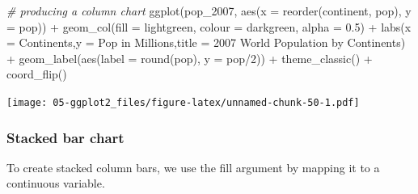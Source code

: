 \documentclass[
]{book}
\newenvironment{Shaded}{\begin{snugshade}}{\end{snugshade}}
\newcommand{\AttributeTok}[1]{\textcolor[rgb]{0.77,0.63,0.00}{#1}}
\newcommand{\CommentTok}[1]{\textcolor[rgb]{0.56,0.35,0.01}{\textit{#1}}}
\newcommand{\DecValTok}[1]{\textcolor[rgb]{0.00,0.00,0.81}{#1}}
\newcommand{\FloatTok}[1]{\textcolor[rgb]{0.00,0.00,0.81}{#1}}
\newcommand{\FunctionTok}[1]{\textcolor[rgb]{0.00,0.00,0.00}{#1}}
\newcommand{\NormalTok}[1]{#1}
\newcommand{\SpecialCharTok}[1]{\textcolor[rgb]{0.00,0.00,0.00}{#1}}
\newcommand{\StringTok}[1]{\textcolor[rgb]{0.31,0.60,0.02}{#1}}
\begin{document}
\begin{Shaded}
\begin{Highlighting}[]
\CommentTok{\# producing a column chart}
\FunctionTok{ggplot}\NormalTok{(pop\_2007, }\FunctionTok{aes}\NormalTok{(}\AttributeTok{x =} \FunctionTok{reorder}\NormalTok{(continent, pop), }\AttributeTok{y =}\NormalTok{ pop)) }\SpecialCharTok{+} 
   \FunctionTok{geom\_col}\NormalTok{(}\AttributeTok{fill =} \StringTok{\textquotesingle{}lightgreen\textquotesingle{}}\NormalTok{, }\AttributeTok{colour =} \StringTok{\textquotesingle{}darkgreen\textquotesingle{}}\NormalTok{, }\AttributeTok{alpha =} \FloatTok{0.5}\NormalTok{) }\SpecialCharTok{+}
   \FunctionTok{labs}\NormalTok{(}\AttributeTok{x =} \StringTok{\textquotesingle{}Continents\textquotesingle{}}\NormalTok{,}\AttributeTok{y =} \StringTok{\textquotesingle{}Pop in Millions\textquotesingle{}}\NormalTok{,}\AttributeTok{title =} \StringTok{\textquotesingle{}2007 World Population by Continents\textquotesingle{}}\NormalTok{) }\SpecialCharTok{+}
   \FunctionTok{geom\_label}\NormalTok{(}\FunctionTok{aes}\NormalTok{(}\AttributeTok{label =} \FunctionTok{round}\NormalTok{(pop), }\AttributeTok{y =}\NormalTok{ pop}\SpecialCharTok{/}\DecValTok{2}\NormalTok{)) }\SpecialCharTok{+}
   \FunctionTok{theme\_classic}\NormalTok{() }\SpecialCharTok{+}
   \FunctionTok{coord\_flip}\NormalTok{()}
\end{Highlighting}
\end{Shaded}

\texttt{[image: 05-ggplot2\_files/figure-latex/unnamed-chunk-50-1.pdf]}

\hypertarget{stacked-bar-chart}{%
\subsubsection{Stacked bar chart}\label{stacked-bar-chart}}

To create stacked column bars, we use the fill argument by mapping it to a continuous variable.
\end{document}
